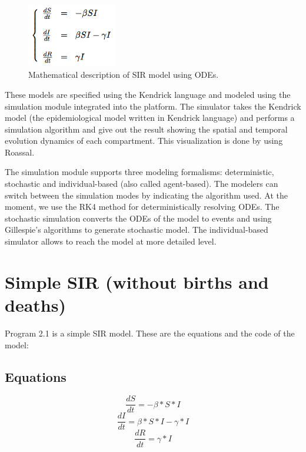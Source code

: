 \documentclass[a4paper,10pt,twoside]{book}
\begin{document}
\begin{figure}

\begin{center}
\includegraphics[width=0.35\textwidth]{figures/equation1.png}\caption{Mathematical description of SIR model using ODEs.\label{equation1}}\end{center}
\end{figure}


These models are specified using the Kendrick language and modeled using the simulation module integrated into the platform.
The simulator takes the Kendrick model (the epidemiological model written in Kendrick language) and performs a simulation algorithm and give out the result showing the spatial and temporal evolution dynamics of each compartment. This visualization is done by using Roassal.

The simulation module supports three modeling formalisms: deterministic, stochastic and individual-based (also called agent-based).
The modelers can switch between the simulation modes by indicating the algorithm used. At the moment, we use the RK4 method for deterministically resolving ODEs.
The stochastic simulation converts the ODEs of the model to events and using Gillespie's algorithms to generate stochastic model.
The individual-based simulator allows to reach the model at more detailed level.
\section{ Simple SIR (without births and deaths)}
Program 2.1 is a simple SIR model. These are the equations and the code of the model:
\subsection{ Equations}

\begin{equation}
\frac{dS}{dt} = -\beta*S*I
\end{equation}
\begin{equation}
\frac{dI}{dt} = \beta*S*I-\gamma*I
\end{equation}
\begin{equation}
\frac{dR}{dt} = \gamma*I
\end{equation}
\end{document}
